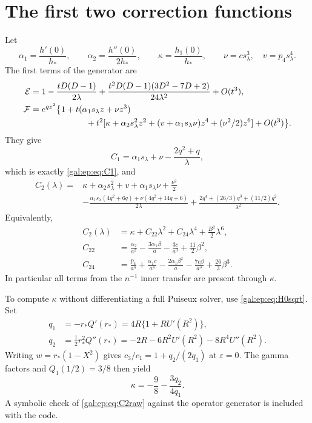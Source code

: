 \documentclass[11pt,letterpaper]{article}
\numberwithin{equation}{section}
\theoremstyle{definition}\newtheorem{definition}[theorem]{Definition}
\theoremstyle{remark}\newtheorem{remark}[theorem]{Remark}
\newcommand{\eps}{\varepsilon}
\begin{document}
\section{The first two correction functions}\label{gal:ep:sec:C2}
Let
\[
\alpha_1=\frac{h'(0)}{h_*},\qquad
\alpha_2=\frac{h''(0)}{2h_*},\qquad
\kappa=\frac{h_1(0)}{h_*},\qquad
\nu=cs_\lambda^3,\quad v=p_4s_\lambda^4.
\]
The first terms of the generator are
\begin{align*}
\mathcal E&=1-\frac{tD(D-1)}{2\lambda}
+\frac{t^2D(D-1)(3D^2-7D+2)}{24\lambda^2}+O(t^3),\\
\mathcal F&=e^{qz^2}\bigl\{1+t(\alpha_1s_\lambda z+\nu z^3)\\
&\hspace{23mm}+t^2[\kappa+\alpha_2s_\lambda^2z^2
 +(v+\alpha_1s_\lambda\nu)z^4+(\nu^2/2)z^6]+O(t^3)\bigr\}.
\end{align*}
They give
\[
C_1=\alpha_1s_\lambda+\nu-\frac{2q^2+q}{\lambda},
\]
which is exactly \eqref{gal:ep:eq:C1}, and
\begin{align}\label{gal:ep:eq:C2raw}
C_2(\lambda)={}&\kappa+\alpha_2s_\lambda^2+v+\alpha_1s_\lambda\nu+\frac{\nu^2}{2}\nonumber\\
&-\frac{\alpha_1s_\lambda(4q^2+6q)+\nu(4q^2+14q+6)}{2\lambda}
 +\frac{2q^4+(26/3)q^3+(11/2)q^2}{\lambda^2}.
\end{align}
Equivalently,
\begin{align}\label{gal:ep:eq:C2poly}
C_2(\lambda)&=\kappa+C_{22}\lambda^2+C_{24}\lambda^4+\frac{B^2}{2}\lambda^6,\\
C_{22}&=\frac{\alpha_2}{a^2}-\frac{3\alpha_1\beta}{a}
-\frac{3c}{a^3}+\frac{11}{2}\beta^2,\nonumber\\
C_{24}&=\frac{p_4}{a^4}+\frac{\alpha_1c}{a^4}
-\frac{2\alpha_1\beta^2}{a}-\frac{7c\beta}{a^3}+\frac{26}{3}\beta^3.\nonumber
\end{align}
In particular all terms from the $n^{-1}$ inner transfer are present through $\kappa$.

To compute $\kappa$ without differentiating a full Puiseux solver, use \eqref{gal:ep:eq:H0sqrt}. Set
\begin{align*}
q_1&=-r_*Q'(r_*)=4R\{1+R U'(R^2)\},\\
q_2&=\tfrac12r_*^2Q''(r_*)
=-2R-6R^2U'(R^2)-8R^4U''(R^2).
\end{align*}
Writing $w=r_*(1-X^2)$ gives $c_3/c_1=1+q_2/(2q_1)$ at $\eps=0$. The gamma factors and $Q_1(1/2)=3/8$ then yield
\begin{equation}\label{gal:ep:eq:kappa}
\kappa=-\frac98-\frac{3q_2}{4q_1}.
\end{equation}
A symbolic check of \eqref{gal:ep:eq:C2raw} against the operator generator is included with the code.
\end{document}

